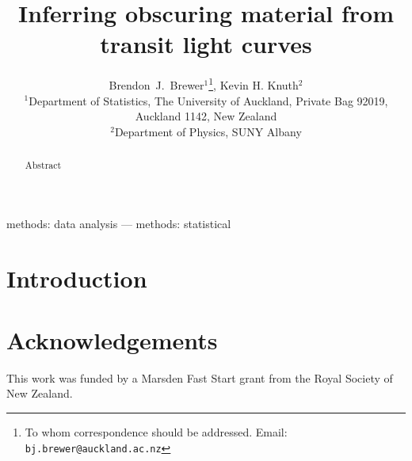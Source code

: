 \documentclass[useAMS,usenatbib]{mn2e}
\title[]
{Inferring obscuring material from transit light curves}
\author[Brewer and Knuth]{%
  Brendon~J.~Brewer$^{1}$\thanks{To whom correspondence should be addressed. Email: {\tt bj.brewer@auckland.ac.nz}},
  Kevin H. Knuth$^2$
  \medskip\\
  $^1$Department of Statistics, The University of Auckland, Private Bag 92019, Auckland 1142, New Zealand\\
  $^2$Department of Physics, SUNY Albany}
\begin{document}
             
\date{}
             
\maketitle

\label{firstpage}

\begin{abstract}
Abstract
\end{abstract}


\begin{keywords}
methods: data analysis --- methods: statistical
\end{keywords}

\section{Introduction}


\section*{Acknowledgements}
This work was funded by a Marsden Fast Start grant from the Royal Society of
New Zealand.


\begin{thebibliography}{99}
\end{thebibliography}
\end{document}

